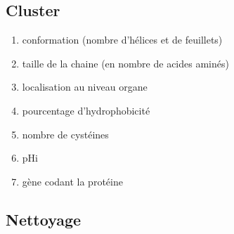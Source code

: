 \pagebreak
\subsection{Cluster}
\begin{enumerate}
\item conformation (nombre d'hélices et de feuillets)
\item taille de la chaine (en nombre de acides aminés)
\item localisation au niveau organe
\item pourcentage d'hydrophobicité
\item nombre de cystéines
\item pHi
\item gène codant la protéine
\end{enumerate}

\subsection*{Nettoyage}
